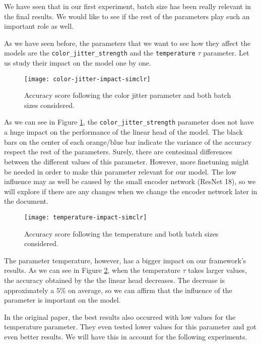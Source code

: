 We have seen that in our first experiment, batch size has been really relevant in the final results. We would like to see if the rest of the parameters play such an important role as well. 

As we have seen before, the parameters that we want to see how they affect the models are the \lstinline{color_jitter_strength} and the \lstinline{temperature} $\tau$ parameter. Let us study their impact on the model one by one. 

\begin{figure}[H] 
    \centering
    \texttt{[image: color-jitter-impact-simclr]}%
    
    \caption{Accuracy score following the color jitter parameter and both batch sizes considered.}
    
    \label{exp:simclr:colorjitter:impact}
\end{figure}

As we can see in Figure \ref{exp:simclr:colorjitter:impact}, the \lstinline{color_jitter_strength} parameter does not have a huge impact on the performance of the linear head of the model. The black bars on the center of each orange/blue bar indicate the variance of the accuracy respect the rest of the parameters. Surely, there are centesimal differences between the different values of this parameter. However, more finetuning might be needed in order to make this parameter relevant for our model. The low influence may as well be caused by the small encoder network (ResNet 18), so we will explore if there are any changes when we change the encoder network later in the document.

\begin{figure}[H] 
    \centering
        \texttt{[image: temperature-impact-simclr]}%
       
        \caption{Accuracy score following the temperature and both batch sizes considered.}
        
    \label{exp:simclr:temperature:impact}
\end{figure}

The parameter temperature, however, has a bigger impact on our framework's results. As we can see in Figure \ref{exp:simclr:temperature:impact}, when the temperature $\tau$ takes larger values, the accuracy obtained by the the linear head decreases. The decrease is approximately a $5\%$ on average, so we can affirm that the influence of the parameter is important on the model.

In the original paper, the best results also occurred with low values for the temperature parameter. They even tested lower values for this parameter and got even better results. We will have this in account for the following experiments.

